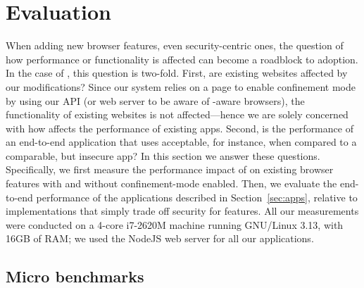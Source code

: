 \section{Evaluation}
\label{sec:eval}

When adding new browser features, even security-centric ones, the
question of how performance or functionality is affected can become a
roadblock to adoption.
%
In the case of \sys{}, this question is two-fold.
%
First, are existing websites affected by our modifications?
%
Since our system relies on a page to enable confinement mode by using
our API (or web server to be aware of \sys{}-aware browsers), the
functionality of existing websites is not affected---hence we are
solely concerned with how \sys{} affects the performance of existing
apps.
%
Second, is the performance of an end-to-end application that uses
\sys{} acceptable, for instance, when compared to a comparable, but
insecure app?
%
In this section we answer these questions.
%
Specifically, we first measure the performance impact of \sys{} on
existing browser features with and without confinement-mode enabled.
%
Then, we evaluate the end-to-end performance of the
applications described in Section~\ref{sec:apps}, relative to
implementations that simply trade off security for features.
%
All our measurements were conducted on a 4-core i7-2620M machine
running GNU/Linux 3.13, with 16GB of RAM\@; we used the NodeJS web
server for all our applications.
%



\subsection{Micro benchmarks}
\label{sec:eval:micro}

\newcommand*\rot{\rotatebox{90}}


